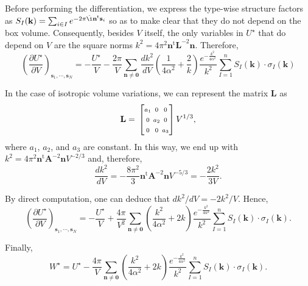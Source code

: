 \documentclass[11pt]{article}
\makeatletter
\newcommand{\mt}[1]{\boldsymbol{\mathbf{#1}}}           %
\newcommand{\vt}[1]{\boldsymbol{\mathbf{#1}}}           %
\newcommand{\tr}[1]{#1^\text{t}}                        %
\newcommand{\diff}[2]{\frac{\partial #1}{\partial #2}}  %
\newcommand{\im}{\hat{\i}}                              %
\newenvironment{smallarray}[1]                          %
{\null\,\vcenter\bgroup\scriptsize
	\renewcommand{\arraystretch}{1.5}
	\arraycolsep=.13885em
	\hbox\bgroup$\left[\array{@{}#1@{}}}
{\endarray\right]$\egroup\egroup\,\null}
\makeatother
\begin{document}
Before performing the differentiation, we express the type-wise structure factors as $S_I(\vt k) = \sum_{i \in I} e^{-2\pi\im \tr{\vt n}{\vt s}_i}$ so as to make clear that they do not depend on the box volume. Consequently, besides $V$ itself, the only variables in $U^\star$ that do depend on $V$ are the square norms $k^2 = 4\pi^2 \tr{\vt n}{\mt L}^{-2}{\vt n}$. Therefore,
\begin{equation*}
\left(\diff{U^\star}{V}\right)_{{\vt s}_1,\cdots,{\vt s}_N} = -\frac{U^\star}{V} - \frac{2\pi}{V} \sum_{\vt n \neq \vt 0} \frac{dk^2}{dV}\left( \frac{1}{4\alpha^2} + \frac{2}{k}\right) \frac{e^{-\frac{k^2}{4\alpha^2}}}{k^2} \sum_{I=1}^n S_I(\vt k) \cdot \sigma_I(\vt k)
\end{equation*}

In the case of isotropic volume variations, we can represent the matrix $\mt L$ as
\begin{equation*}
\mt L = \begin{smallarray}{ccc}
a_1 &  0  &  0  \\
 0  & a_2 &  0  \\
 0  &  0  & a_3 \\
\end{smallarray}V^{1/3},
\end{equation*}
where $a_1$, $a_2$, and $a_3$ are constant. In this way, we end up with $k^2 = 4\pi^2 \tr{\vt n}{\mt A}^{-2}{\vt n}V^{-2/3}$ and, therefore,
\begin{equation*}
\frac{dk^2}{dV} = -\frac{8\pi^2}{3} \tr{\vt n}{\mt A}^{-2}{\vt n}V^{-5/3} = -\frac{2k^2}{3V}.
\end{equation*}


By direct computation, one can deduce that $dk^2/dV = -2k^2/V$. Hence,
\begin{equation*}
\left(\diff{U^\star}{V}\right)_{{\vt s}_1,\cdots,{\vt s}_N} = -\frac{U^\star}{V} + \frac{4\pi}{V^2} \sum_{\vt n \neq \vt 0} \left( \frac{k^2}{4\alpha^2} + 2k\right) \frac{e^{-\frac{k^2}{4\alpha^2}}}{k^2} \sum_{I=1}^n S_I(\vt k) \cdot \sigma_I(\vt k).
\end{equation*}

Finally,
\begin{equation*}
W^\star = U^\star -\frac{4\pi}{V} \sum_{\vt n \neq \vt 0} \left( \frac{k^2}{4\alpha^2} + 2k\right) \frac{e^{-\frac{k^2}{4\alpha^2}}}{k^2} \sum_{I=1}^n S_I(\vt k) \cdot \sigma_I(\vt k).
\end{equation*}
\end{document}
